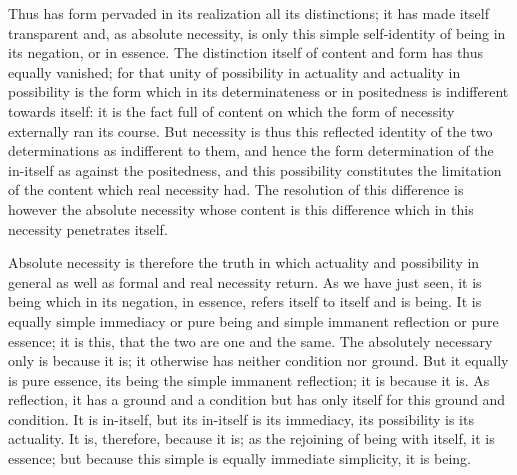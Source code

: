Thus has form pervaded in its realization all its distinctions;
it has made itself transparent and, as absolute necessity, is only this
simple self-identity of being in its negation, or in essence.
The distinction itself of content and form
has thus equally vanished;
for that unity of possibility in actuality
and actuality in possibility is
the form which in its determinateness
or in positedness is indifferent towards itself:
it is the fact full of content on which
the form of necessity externally ran its course.
But necessity is thus this reflected identity of
the two determinations as indifferent to them,
and hence the form determination of the in-itself
as against the positedness,
and this possibility constitutes the limitation of
the content which real necessity had.
The resolution of this difference is
however the absolute necessity
whose content is this difference
which in this necessity penetrates itself.

Absolute necessity is therefore the truth
in which actuality and possibility in general
as well as formal and real necessity return.
As we have just seen, it is being which in its negation,
in essence, refers itself to itself and is being.
It is equally simple immediacy or pure being
and simple immanent reflection or pure essence;
it is this, that the two are one and the same.
The absolutely necessary only is because it is;
it otherwise has neither condition nor ground.
But it equally is pure essence,
its being the simple immanent reflection;
it is because it is.
As reflection, it has a ground and a condition
but has only itself for this ground and condition.
It is in-itself, but its in-itself is its immediacy,
its possibility is its actuality.
It is, therefore, because it is;
as the rejoining of being with itself,
it is essence;
but because this simple is equally immediate simplicity,
it is being.

